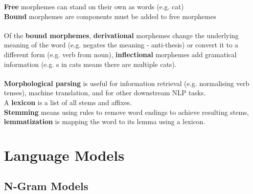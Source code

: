\documentclass[]{article}
\begin{document}
	\textbf{Free} morphemes can stand on their own as words (e.g. cat) \\
	\textbf{Bound} morphemes are components must be added to free morphemes \\ \\
	
	Of the \textbf{bound morphemes}, \textbf{derivational} morphemes change the underlying meaning of the word (e.g. negates the meaning - anti-thesis) or convert it to a different form (e.g. verb from noun), \textbf{inflectional} morphemes add gramatical information (e.g. s in cats means there are multiple cats). \\ \\
	
	\textbf{Morphological parsing} is useful for information retrieval (e.g. normalising verb tenses), machine translation, and for other downstream NLP tasks. \\
	
	A \textbf{lexicon} is a list of all stems and affixes. \\ 
	
	\textbf{Stemming} means using rules to remove word endings to achieve resulting stems, \textbf{lemmatization} is mapping the word to its lemma using a lexicon. \\
	
	
	
	
	
	
	\clearpage
	\section{Language Models}
	
	\subsection{N-Gram Models}
	
\end{document}
